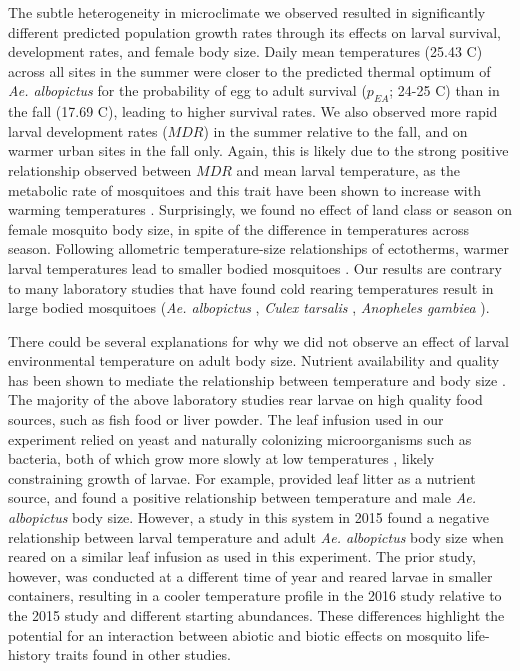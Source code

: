 \documentclass[12pt]{article}
\begin{document}
The subtle heterogeneity in microclimate we observed resulted in significantly different predicted population growth rates through its effects on larval survival, development rates, and female body size. Daily mean temperatures (25.43 \degree C) across all sites in the summer were closer to the predicted thermal optimum of \textit{Ae. albopictus} for the probability of egg to adult survival ($p_{EA}$; 24-25 \degree C) \citep{mordecai2017} than in the fall (17.69 \degree C), leading to higher survival rates. We also observed more rapid larval development rates ($MDR$) in the summer relative to the fall, and on warmer urban sites in the fall only. Again, this is likely due to the strong positive relationship observed between $MDR$ and  mean larval temperature, as the metabolic rate of mosquitoes and this trait have been shown to increase with warming temperatures \citep{delatte2009}. Surprisingly, we found no effect of land class or season on female mosquito body size, in spite of the difference in temperatures across season. Following allometric temperature-size relationships of ectotherms, warmer larval temperatures lead to smaller bodied mosquitoes \citep{angilleta2004,kingsolver2008}. Our results are contrary to many laboratory studies that have found cold rearing temperatures result in large bodied mosquitoes (\textit{Ae. albopictus} \citep{reiskind2012a}, \textit{Culex tarsalis} \citep{dodson2012}, \textit{Anopheles gambiea} \citep{koella1996}).

There could be several explanations for why we did not observe an effect of larval environmental temperature on adult body size. Nutrient availability and quality has been shown to mediate the relationship between temperature and body size \citep{farjana2011}. The majority of the above laboratory studies rear larvae on high quality food sources, such as fish food or liver powder. The leaf infusion used in our experiment relied on yeast and naturally colonizing microorganisms such as bacteria, both of which grow more slowly at low temperatures \citep{ratkowsky1982}, likely constraining growth of larvae. For example, \citet{lounibos2002} provided leaf litter as a nutrient source, and found a positive relationship between temperature and male \textit{Ae. albopictus} body size. However, a study in this system in 2015 found a negative relationship between larval temperature and adult \textit{Ae. albopictus} body size \citep{murdock2017} when reared on a similar leaf infusion as used in this experiment. The prior study, however, was conducted at a different time of year and reared larvae in smaller containers, resulting in a cooler temperature profile in the 2016 study relative to the 2015 study and different starting abundances. These differences highlight the potential for an interaction between abiotic and biotic effects on mosquito life-history traits found in other studies.
\end{document}
